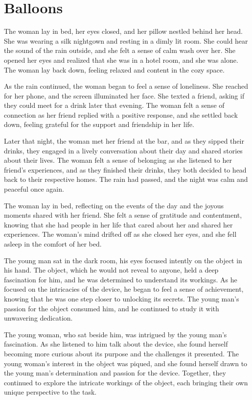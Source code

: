 \documentclass[smalldemyvopaper,11pt,twoside,onecolumn,openright,extrafontsizes]{memoir}
\begin{document}
\chapter{Balloons}
The woman lay in bed, her eyes closed, and her pillow nestled behind her head. She was wearing a silk nightgown and resting in a dimly lit room. She could hear the sound of the rain outside, and she felt a sense of calm wash over her. She opened her eyes and realized that she was in a hotel room, and she was alone. The woman lay back down, feeling relaxed and content in the cozy space.\par
As the rain continued, the woman began to feel a sense of loneliness. She reached for her phone, and the screen illuminated her face. She texted a friend, asking if they could meet for a drink later that evening. The woman felt a sense of connection as her friend replied with a positive response, and she settled back down, feeling grateful for the support and friendship in her life.\par
Later that night, the woman met her friend at the bar, and as they sipped their drinks, they engaged in a lively conversation about their day and shared stories about their lives. The woman felt a sense of belonging as she listened to her friend's experiences, and as they finished their drinks, they both decided to head back to their respective homes. The rain had passed, and the night was calm and peaceful once again.\par
The woman lay in bed, reflecting on the events of the day and the joyous moments shared with her friend. She felt a sense of gratitude and contentment, knowing that she had people in her life that cared about her and shared her experiences. The woman's mind drifted off as she closed her eyes, and she fell asleep in the comfort of her bed.\par
The young man sat in the dark room, his eyes focused intently on the object in his hand. The object, which he would not reveal to anyone, held a deep fascination for him, and he was determined to understand its workings. As he focused on the intricacies of the device, he began to feel a sense of achievement, knowing that he was one step closer to unlocking its secrets. The young man's passion for the object consumed him, and he continued to study it with unwavering dedication.\par
The young woman, who sat beside him, was intrigued by the young man's fascination. As she listened to him talk about the device, she found herself becoming more curious about its purpose and the challenges it presented. The young woman's interest in the object was piqued, and she found herself drawn to the young man's determination and passion for the device. Together, they continued to explore the intricate workings of the object, each bringing their own unique perspective to the task.\par
\end{document}

